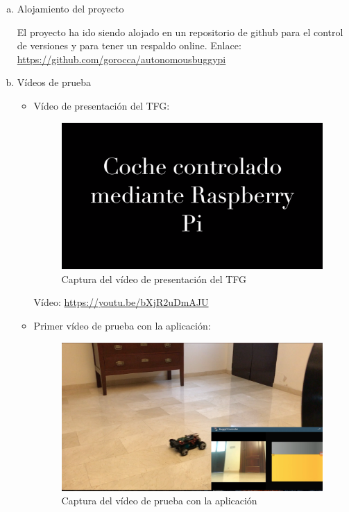 \documentclass{pclass}
\begin{document}
\begin{enumerate}[a)]
	\item Alojamiento del proyecto
	
		El proyecto ha ido siendo alojado en un repositorio de github para el control de versiones y para tener un respaldo online. Enlace: \url{https://github.com/gorocca/autonomousbuggypi}
	
	\item Vídeos de prueba
		\begin{itemize}
			\item Vídeo de presentación del TFG:
				\begin{figure}[H]
					\centering
					\includegraphics[width=1\textwidth]{img/videoPresentacion}
					\caption{Captura del vídeo de presentación del TFG}
					\label{fig:capturaVideoPresentacion}
				\end{figure}
		
				 Vídeo: \url{https://youtu.be/bXjR2uDmAJU}
				 \clearpage
				 
				 \item Primer vídeo de prueba con la aplicación:
				 \begin{figure}[H]
				 	\centering
				 	\includegraphics[width=1\textwidth]{img/capturaPrimerVideoApp}
				 	\caption{Captura del vídeo de prueba con la aplicación}
				 	\label{fig:capturaPrimerVideoApp}
				 \end{figure}
				 

\end{itemize}
\end{enumerate}
\end{document}
